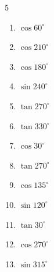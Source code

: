 \begin{multicols}{5}
\begin{enumerate}
  \item $\displaystyle \cos{60^\circ}$


  \item $\displaystyle \cos{210^\circ}$


  \item $\displaystyle \cos{180^\circ}$

        \phantom{$\displaystyle =-1$}

  \item $\displaystyle \sin{240^\circ}$


  \item $\displaystyle \tan{270^\circ}$

        \phantom{$\displaystyle なし$}

  \item $\displaystyle \tan{330^\circ}$


  \item $\displaystyle \cos{30^\circ}$


  \item $\displaystyle \tan{270^\circ}$

        \phantom{$\displaystyle なし$}

  \item $\displaystyle \cos{135^\circ}$


\columnbreak %

  \item $\displaystyle \sin{120^\circ}$


  \item $\displaystyle \tan{30^\circ}$


  \item $\displaystyle \cos{270^\circ}$

        \phantom{$\displaystyle =0$}

  \item $\displaystyle \sin{315^\circ}$


\end{enumerate}
\end{multicols}
